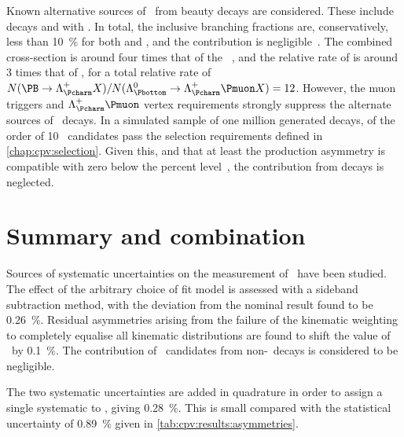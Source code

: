 Known alternative sources of \PLambdac\ from beauty decays are considered.
These include \decay{\PBplus}{\APLambdac\Pproton\Ppiplus} decays and
\decay{\PBplus}{\APSigmac\Pproton\Ppi\Ppi} with
\decay{\PSigmac}{\PLambdac\Ppi}.
In total, the inclusive  branching fractions are,
conservatively, less than \SI{10}{\percent} for both \PBplus and \PBzero, and
the \PBs contribution is negligible~\cite{PDG2014}.
The combined \PB cross-section is around four times that of the
\PLambdab~\cite{LHCb-PAPER-2013-004,Aaij:2015fea}, and the relative rate of
 is around 3 times that of \LbToLcmuX, for a total
relative rate of $N(\decay{\PB}{\PLambdac X})/N(\LbToLcmuX) = 12$.
However, the muon triggers and $\PLambdac\Pmuon$ vertex requirements strongly
suppress the alternate sources of \PLambdac\ decays.
In a simulated sample of one million generated
\decay{\PBzero}{\APLambdac\Pproton\Ppiminus\Ppiplus} decays, of the order of 10
\PLambdac\ candidates pass the selection requirements defined in
\cref{chap:cpv:selection}.
Given this, and that at least the \PBzero production asymmetry is compatible
with zero below the percent level~\cite{Aaij:2014bba}, the contribution from
\PB decays is neglected.

\section{Summary and combination}
\label{chap:cpv:syst:summary}

Sources of systematic uncertainties on the measurement of \dACP\ have been
studied.
The effect of the arbitrary choice of fit model is assessed with a sideband
subtraction method, with the deviation from the nominal result found to be
\SI{0.26}{\percent}.
Residual asymmetries arising from the failure of the kinematic weighting to
completely equalise all kinematic distributions are found to shift the value of
\dACP\ by \SI{0.1}{\percent}.
The contribution of \PLambdac\ candidates from non-\PLambdab\ decays is
considered to be negligible.

The two systematic uncertainties are added in quadrature in order to assign a
single systematic to \dACP, giving \SI{0.28}{\percent}.
This is small compared with the statistical uncertainty of \SI{0.89}{\percent}
given in \cref{tab:cpv:results:asymmetries}.

